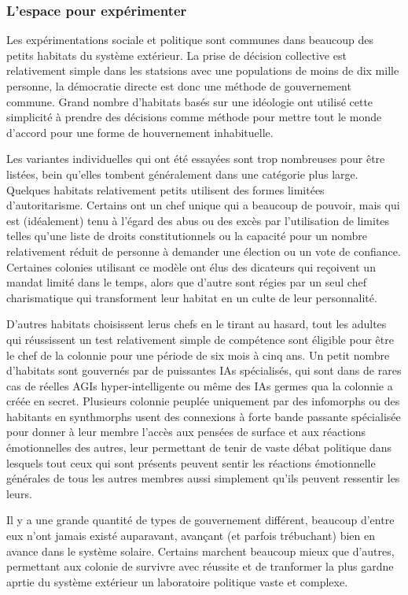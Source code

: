 \subsubsection{L'espace pour expérimenter} \label{sec:space-exper} 

Les expérimentations sociale et politique sont communes dans beaucoup des petits habitats du système extérieur. La prise de décision collective est relativement simple dans les statsions avec une populations de moins de dix mille personne, la démocratie directe est donc une méthode de gouvernement commune. Grand nombre d'habitats basés sur une idéologie ont utilisé cette simplicité à prendre des décisions comme méthode pour mettre tout le monde d'accord pour une forme de houvernement inhabituelle. 

Les variantes individuelles qui ont été essayées sont trop nombreuses pour être listées, bein qu'elles tombent généralement dans une catégorie plus large. Quelques habitats relativement petits utilisent des formes limitées d'autoritarisme. Certains ont un chef unique qui a beaucoup de pouvoir, mais qui est (idéalement) tenu à l'égard des abus ou des excès par l'utilisation de limites telles qu'une liste de droits constitutionnels ou la capacité pour un nombre relativement réduit de personne à demander une élection ou un vote de confiance. Certaines colonies utilisant ce modèle ont élus des dicateurs qui reçoivent un mandat limité dans le temps, alors que d'autre sont régies par un seul chef charismatique qui transforment leur habitat en un culte de leur personnalité. 

D'autres habitats choisissent lerus chefs en le tirant au hasard, tout les adultes qui réussissent un test relativement simple de compétence sont éligible pour être le chef de la colonnie pour une période de six mois à cinq ans. Un petit nombre d'habitats sont gouvernés par de puissantes IAs spécialisés, qui sont dans de rares cas de réelles AGIs hyper-intelligente ou même des IAs germes qua la colonnie a créée en secret. Plusieurs colonnie peuplée uniquement par des infomorphs ou des habitants en synthmorphs usent des connexions à forte bande passante spécialisée pour donner à leur membre l'accès aux pensées de surface et aux réactions émotionnelles des autres, leur permettant de tenir de vaste débat politique dans lesquels tout ceux qui sont présents peuvent sentir les réactions émotionnelle générales de tous les autres membres aussi simplement qu'ils peuvent ressentir les leurs. 

Il y a une grande quantité de types de gouvernement différent, beaucoup d'entre eux n'ont jamais existé auparavant, avançant (et parfois trébuchant) bien en avance dans le système solaire. Certains marchent beaucoup mieux que d'autres, permettant aux colonie de survivre avec réussite et de tranformer la plus gardne aprtie du système extérieur un laboratoire politique vaste et complexe. 


